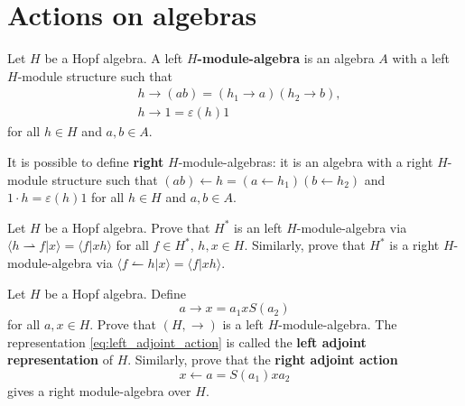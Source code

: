 
\section{Actions on algebras}

\begin{definition}
\label{def:module_algebra}
Let $H$ be a Hopf algebra. A left \textbf{$H$-module-algebra} is an algebra
$A$ with a left $H$-module structure such that
\begin{align*}
&h\rightarrow(ab)=(h_{1}\rightarrow a)(h_{2}\rightarrow b),\\
&h\rightarrow1=\varepsilon(h)1
\end{align*}
for all $h\in H$ and $a,b\in A$. 
\end{definition}

It is possible to define \textbf{right} $H$-module-algebras: it is an
algebra with a right $H$-module structure such that $(ab)\leftarrow
h=(a\leftarrow h_{1})(b\leftarrow h_{2})$ and $1\cdot h=\varepsilon(h)1$ for
all $h\in H$ and $a,b\in A$. 

\begin{exercise}
Let $H$ be a Hopf algebra.  Prove that $H^*$ is an left $H$-module-algebra
via  $\langle h\rightharpoonup f|x\rangle=\langle f|xh\rangle$ for all $f\in
H^*$, $h,x\in H$.  Similarly, prove that $H^*$ is a right $H$-module-algebra
via $\langle f\leftharpoonup h|x\rangle=\langle f|xh\rangle$.
\end{exercise}

\begin{exercise}
\label{exercise:adjoint}
Let $H$ be a Hopf algebra. Define 
\begin{equation}
a\rightarrow x=a_{1}xS(a_{2})\label{eq:left_adjoint_action}
\end{equation}
for all $a,x\in H$. Prove that $(H,\rightarrow)$ is a left $H$-module-algebra.
The representation \ref{eq:left_adjoint_action} is called the \textbf{left
adjoint representation} of $H$. Similarly, prove that the \textbf{right
adjoint action}
\begin{equation}
x\leftarrow a=S(a_{1})xa_{2}\label{eq:right_adjoint_action}
\end{equation}
gives a right module-algebra over $H$.
\end{exercise}

